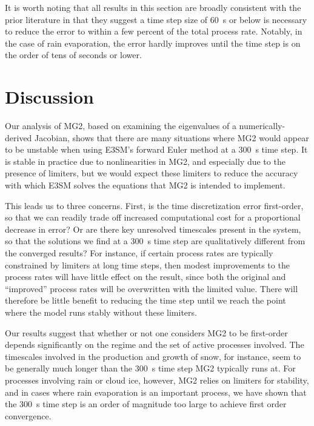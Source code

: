 \documentclass [11pt, proquest] {uwthesis}[2020/02/24]
\begin{document}
It is worth noting that all results in this section are broadly consistent with the prior literature in that they suggest a time step size of \SI{60}{\second} or below is necessary to reduce the error to within a few percent of the total process rate. Notably, in the case of rain evaporation, the error hardly improves until the time step is on the order of tens of seconds or lower.

\section{Discussion}

Our analysis of MG2, based on examining the eigenvalues of a numerically-derived Jacobian, shows that there are many situations where MG2 would appear to be unstable when using E3SM's forward Euler method at a \SI{300}{\second} time step. It is stable in practice due to nonlinearities in MG2, and especially due to the presence of limiters, but we would expect these limiters to reduce the accuracy with which E3SM solves the equations that MG2 is intended to implement.

This leads us to three concerns. First, is the time discretization error first-order, so that we can readily trade off increased computational cost for a proportional decrease in error? Or are there key unresolved timescales present in the system, so that the solutions we find at a \SI{300}{\second} time step are qualitatively different from the converged results? For instance, if certain process rates are typically constrained by limiters at long time steps, then modest improvements to the process rates will have little effect on the result, since both the original and ``improved'' process rates will be overwritten with the limited value. There will therefore be little benefit to reducing the time step until we reach the point where the model runs stably without these limiters.

Our results suggest that whether or not one considers MG2 to be first-order depends significantly on the regime and the set of active processes involved. The timescales involved in the production and growth of snow, for instance, seem to be generally much longer than the \SI{300}{\second} time step MG2 typically runs at. For processes involving rain or cloud ice, however, MG2 relies on limiters for stability, and in cases where rain evaporation is an important process, we have shown that the \SI{300}{\second} time step is an order of magnitude too large to achieve first order convergence.
\end{document}
